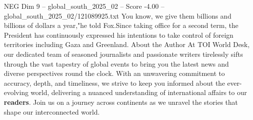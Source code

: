 \begin{textsample}{NEG Dim 9 – global\_south\_2025\_02 – Score -4.00 – global\_south\_2025\_02/121089925.txt}
You know, we give them billions and billions of dollars a year,"he told Fox.Since taking office for a second term, the President has continuously expressed his intentions to take control of foreign territories including Gaza and Greenland.
About the Author At TOI World Desk, our dedicated team of seasoned journalists and passionate writers tirelessly sifts through the vast tapestry of global events to bring you the latest news and diverse perspectives round the clock.
With an unwavering commitment to accuracy, depth, and timeliness, we strive to keep you informed about the ever-evolving world, delivering a nuanced understanding of international affairs to our \textbf{readers}.
Join us on a journey across continents as we unravel the stories that shape our interconnected world.

\end{textsample}
